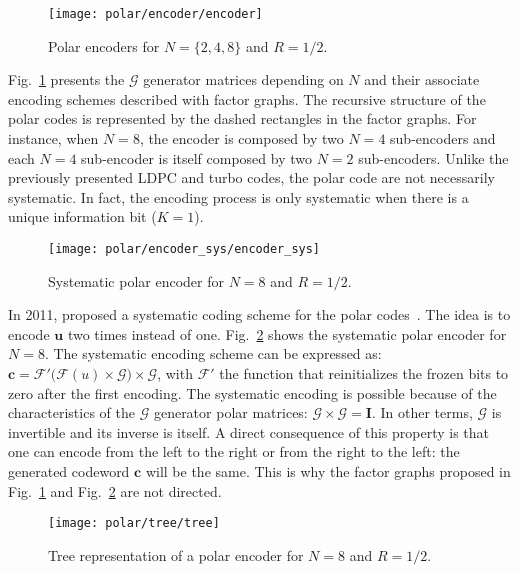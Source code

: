 \begin{figure}[htp]
  \centering
  \texttt{[image: polar/encoder/encoder]}
  \caption{Polar encoders for $N = \{2, 4, 8\}$ and $R = 1/2$.}
  \label{fig:alg_polar_encoder}
\end{figure}

Fig.~\ref{fig:alg_polar_encoder} presents the $\bm{\mathcal{G}}$ generator
matrices depending on $N$ and their associate encoding schemes described with
factor graphs. The recursive structure of the polar codes is represented by the
dashed rectangles in the factor graphs. For instance, when $N = 8$, the encoder
is composed by two $N = 4$ sub-encoders and each $N = 4$ sub-encoder is itself
composed by two $N = 2$ sub-encoders. Unlike the previously presented LDPC and
turbo codes, the polar code are not necessarily systematic. In fact, the
encoding process is only systematic when there is a unique information bit
($K =1$).

\begin{figure}[htp]
  \centering
  \texttt{[image: polar/encoder\_sys/encoder\_sys]}
  \caption{Systematic polar encoder for $N = 8$ and $R = 1/2$.}
  \label{fig:alg_polar_encoder_sys}
\end{figure}

In 2011, \Arikan proposed a systematic coding scheme for the polar
codes~\cite{Arikan2011}. The idea is to encode $\bm{u}$ two times instead of
one. Fig.~\ref{fig:alg_polar_encoder_sys} shows the systematic polar
encoder for $N = 8$. The systematic encoding scheme can be expressed as:
$\bm{c} = \mathcal{F'}\big(\mathcal{F}(u) \times \bm{\mathcal{G}}\big) \times
\bm{\mathcal{G}}$, with $\mathcal{F'}$ the function that reinitializes the
frozen bits to zero after the first encoding. The systematic encoding is
possible because of the characteristics of the $\bm{\mathcal{G}}$ generator
polar matrices: $\bm{\mathcal{G}} \times \bm{\mathcal{G}} = \bm{I}$. In other
terms, $\bm{\mathcal{G}}$ is invertible and its inverse is itself. A direct
consequence of this property is that one can encode from the left to the right
or from the right to the left: the generated codeword $\bm{c}$ will be the same.
This is why the factor graphs proposed in Fig.~\ref{fig:alg_polar_encoder} and
Fig.~\ref{fig:alg_polar_encoder_sys} are not directed.

\begin{figure}[htp]
  \centering
  \texttt{[image: polar/tree/tree]}
  \caption{Tree representation of a polar encoder for $N = 8$ and $R = 1/2$.}
  \label{fig:alg_polar_tree}
\end{figure}

